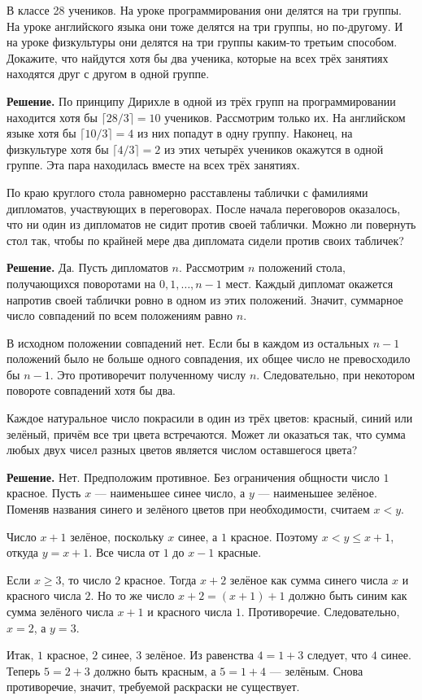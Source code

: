 \begin{problems}
\item В классе 28 учеников. На уроке программирования они делятся на три группы. На уроке английского языка они тоже делятся на три группы, но по-другому. И на уроке физкультуры они делятся на три группы каким-то третьим способом. Докажите, что найдутся хотя бы два ученика, которые на всех трёх занятиях находятся друг с другом в одной группе.
\par\smallskip\noindent\textbf{Решение.} По принципу Дирихле в одной из трёх групп на программировании находится хотя бы $\lceil28/3\rceil=10$ учеников. Рассмотрим только их. На английском языке хотя бы $\lceil10/3\rceil=4$ из них попадут в одну группу. Наконец, на физкультуре хотя бы $\lceil4/3\rceil=2$ из этих четырёх учеников окажутся в одной группе. Эта пара находилась вместе на всех трёх занятиях.\par

\item По краю круглого стола равномерно расставлены таблички с фамилиями дипломатов, участвующих в переговорах. После начала переговоров оказалось, что ни один из дипломатов не сидит против своей таблички. Можно ли повернуть стол так, чтобы по крайней мере два дипломата сидели против своих табличек?
\par\smallskip\noindent\textbf{Решение.} Да. Пусть дипломатов $n$. Рассмотрим $n$ положений стола, получающихся поворотами на $0,1,\ldots,n-1$ мест. Каждый дипломат окажется напротив своей таблички ровно в одном из этих положений. Значит, суммарное число совпадений по всем положениям равно $n$.
\par В исходном положении совпадений нет. Если бы в каждом из остальных $n-1$ положений было не больше одного совпадения, их общее число не превосходило бы $n-1$. Это противоречит полученному числу $n$. Следовательно, при некотором повороте совпадений хотя бы два.\par

\item Каждое натуральное число покрасили в один из трёх цветов: красный, синий или зелёный, причём все три цвета встречаются. Может ли оказаться так, что сумма любых двух чисел разных цветов является числом оставшегося цвета?
\par\smallskip\noindent\textbf{Решение.} Нет. Предположим противное. Без ограничения общности число $1$ красное. Пусть $x$ --- наименьшее синее число, а $y$ --- наименьшее зелёное. Поменяв названия синего и зелёного цветов при необходимости, считаем $x<y$.
\par Число $x+1$ зелёное, поскольку $x$ синее, а $1$ красное. Поэтому $x<y\le x+1$, откуда $y=x+1$. Все числа от $1$ до $x-1$ красные.
\par Если $x\ge3$, то число $2$ красное. Тогда $x+2$ зелёное как сумма синего числа $x$ и красного числа $2$. Но то же число $x+2=(x+1)+1$ должно быть синим как сумма зелёного числа $x+1$ и красного числа $1$. Противоречие. Следовательно, $x=2$, а $y=3$.
\par Итак, $1$ красное, $2$ синее, $3$ зелёное. Из равенства $4=1+3$ следует, что $4$ синее. Теперь $5=2+3$ должно быть красным, а $5=1+4$ --- зелёным. Снова противоречие, значит, требуемой раскраски не существует.\par


\end{problems}
